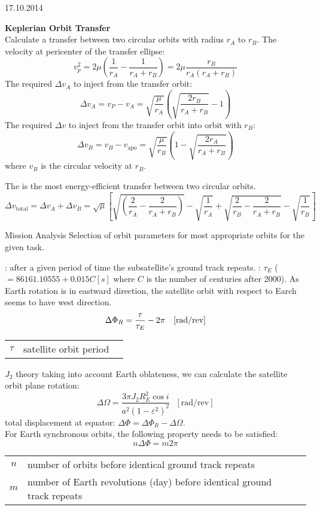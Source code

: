 \begin{chapter}{17.10.2014}
 

\textbf{Keplerian Orbit Transfer}\\
 Calculate a transfer between two circular orbits with radius $r_A$ to $r_B$. The velocity at pericenter of the transfer ellipse:
 \[ v_p^2 = 2 \mu \left( \frac{1}{r_A} - \frac{1}{r_A + r_B} \right) = 2 \mu \frac{r_B}{r_A(r_A+r_B)} \]
 The required $\Delta v_A$ to inject from the transfer orbit:
 \[ \Delta v_A = v_P - v_A = \sqrt{\frac{\mu}{r_A}} \left( \sqrt{\frac{2r_B}{r_A+r_B}} -1\right) \]
 The required $\Delta v$ to inject from the transfer orbit into orbit with $r_B$:
 \[ \Delta v_B = v_B - v_\text{apo} = \sqrt{\frac{\mu}{r_B}} \left( 1 - \sqrt{\frac{2r_A}{r_A+r_B}}\right) \]
 where $v_B$ is the circular velocity at $r_B$.
 
 The  is the most energy-efficient transfer between two circular orbits.
 \[ \Delta v_\text{total} =  \Delta v_A + \Delta v_B = \sqrt{\mu}\left[ \sqrt{\left( \frac{2}{r_A} - \frac{2}{r_A+r_B} \right)} - \sqrt{\frac{1}{r_A}} + \sqrt{\frac{2}{r_B}-\frac{2}{r_A+r_B}} - \sqrt{\frac{1}{r_B}} \right]\]

 \setcounter{chapter}{2}
 \setcounter{section}{2}
 \begin{section}{Mission Analysis}
 Selection of orbit parameters for most appropriate orbits for the given task.
 
 \textbf{}: after a given period of time the subsatellite's ground track repeats. : $\tau_E$  ($ = 86161.10555 + 0.015C [s]$ where $C$ is the number of centuries after 2000). As Earth rotation is in eastward direction, the satellite orbit with respect to Earch seems to have west direction.
 \[ \Delta \Phi_R = \frac{\tau}{\tau_E}-2\pi ~~~[\text{rad}/\text{rev}] \]
 \begin{tabular}{c|l|c}
  $\tau$ & satellite orbit period& 
 \end{tabular}

 $J_2$ theory taking into account Earth oblateness, we can calculate the satellite orbit plane rotation:
 \[\Delta \Omega = \frac{3\pi J_2 R_E^2 \cos i}{a^2(1-\varepsilon^2)^2} ~~~[\text{rad}/\text{rev}]\]
 total displacement at equator: $\Delta \Phi = \Delta \Phi_R - \Delta \Omega$.\\
 For Earth synchronous orbits, the following property needs to be satisfied:
 \[ n\Delta\Phi = m2\pi \]
 \begin{tabular}{c|l|c}
  $n$ & number of orbits before identical ground track repeats & \\
  $m$ & number of Earth revolutions (day) before identical ground track repeats & 
 \end{tabular}
 

\end{section}
\end{chapter}
